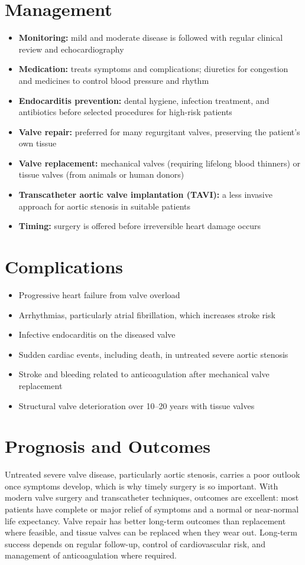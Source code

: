 \section*{Management}
\begin{itemize}
    \item \textbf{Monitoring:} mild and moderate disease is followed with regular clinical review and echocardiography
    \item \textbf{Medication:} treats symptoms and complications; diuretics for congestion and medicines to control blood pressure and rhythm
    \item \textbf{Endocarditis prevention:} dental hygiene, infection treatment, and antibiotics before selected procedures for high-risk patients
    \item \textbf{Valve repair:} preferred for many regurgitant valves, preserving the patient's own tissue
    \item \textbf{Valve replacement:} mechanical valves (requiring lifelong blood thinners) or tissue valves (from animals or human donors)
    \item \textbf{Transcatheter aortic valve implantation (TAVI):} a less invasive approach for aortic stenosis in suitable patients
    \item \textbf{Timing:} surgery is offered before irreversible heart damage occurs
\end{itemize}

\section*{Complications}
\begin{itemize}
    \item Progressive heart failure from valve overload
    \item Arrhythmias, particularly atrial fibrillation, which increases stroke risk
    \item Infective endocarditis on the diseased valve
    \item Sudden cardiac events, including death, in untreated severe aortic stenosis
    \item Stroke and bleeding related to anticoagulation after mechanical valve replacement
    \item Structural valve deterioration over 10--20 years with tissue valves
\end{itemize}

\section*{Prognosis and Outcomes}
Untreated severe valve disease, particularly aortic stenosis, carries a poor outlook once symptoms develop, which is why timely surgery is so important. With modern valve surgery and transcatheter techniques, outcomes are excellent: most patients have complete or major relief of symptoms and a normal or near-normal life expectancy. Valve repair has better long-term outcomes than replacement where feasible, and tissue valves can be replaced when they wear out. Long-term success depends on regular follow-up, control of cardiovascular risk, and management of anticoagulation where required.

